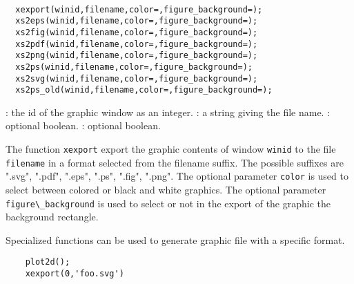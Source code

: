 \begin{mandesc}
  \\
\end{mandesc}
\begin{calling_sequence}
\begin{verbatim}
  xexport(winid,filename,color=,figure_background=);
  xs2eps(winid,filename,color=,figure_background=);
  xs2fig(winid,filename,color=,figure_background=);
  xs2pdf(winid,filename,color=,figure_background=);
  xs2png(winid,filename,color=,figure_background=);
  xs2ps(winid,filename,color=,figure_background=);
  xs2svg(winid,filename,color=,figure_background=);
  xs2ps_old(winid,filename,color=,figure_background=);
\end{verbatim}
\end{calling_sequence}
\begin{parameters}
  \begin{varlist}
    : the id of the graphic window as an integer.
    : a string giving the file name.
    : optional boolean.
    : optional boolean.
  \end{varlist}
\end{parameters}
\begin{mandescription}
  The function \verb!xexport! export the graphic contents of window \verb!winid! to
  the file \verb!filename! in a format selected from the filename suffix.
  The possible suffixes are ".svg", ".pdf", ".eps", ".ps", ".fig", ".png".
  The optional parameter \verb!color! is used to select between colored or black and
  white graphics. The optional parameter \verb!figure\_background! is used to select
  or not in the export of the graphic the background rectangle.

  Specialized functions can be used to generate graphic file with a specific format.
\end{mandescription}
\begin{examples}
  \begin{Verbatim}
    plot2d();
    xexport(0,'foo.svg')
  \end{Verbatim}
\end{examples}
